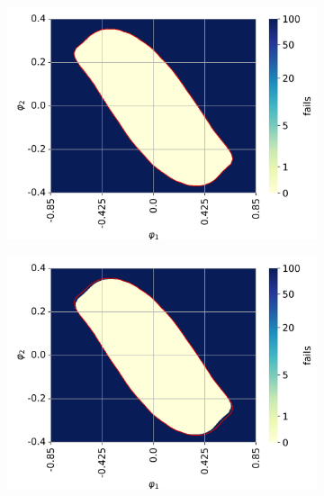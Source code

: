 \begin{figure}[h!]
     \begin{subfigure}[t]{0.32\textwidth}
         \centering
         \includegraphics[width=\textwidth]{Figures/DP_mass_1.2.png}
         \label{fig: DP mass 1.2}
         \caption{}
     \end{subfigure}
     \hfill
     \begin{subfigure}[t]{0.32\textwidth}
         \centering
         \includegraphics[width=\textwidth]{Figures/DP_friction_0.01.png}
         \label{fig: DP friction 0.01}
         \caption{}
     \end{subfigure}
     \hfill
     \begin{subfigure}[t]{0.32\textwidth}
         \centering

\end{subfigure}
\end{figure}
